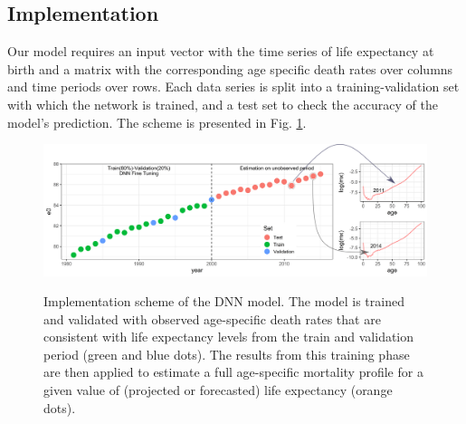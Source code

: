 \documentclass[a4,11pt]{article}
\begin{document}
\subsection*{Implementation}
Our model requires an input vector with the time series of life expectancy at birth and a matrix with the corresponding age specific death rates over columns  and time periods over rows. Each data series is split into a training-validation set with which the network is trained, and a test set to check the accuracy of the model's prediction. The scheme is presented in Fig. \ref{fig:scheme}.

\begin{figure}[H]
	\centering
	\includegraphics[width=1\linewidth]{tr2}\\
	 \caption{Implementation scheme of the DNN model. The model is trained and validated with observed age-specific death rates that are consistent with life expectancy levels from the train and validation period (green and blue dots). The results from this training phase are then applied to estimate a full age-specific mortality profile for a given value of (projected or forecasted) life expectancy (orange dots).}
	 \label{fig:scheme}
\end{figure}
\end{document}

